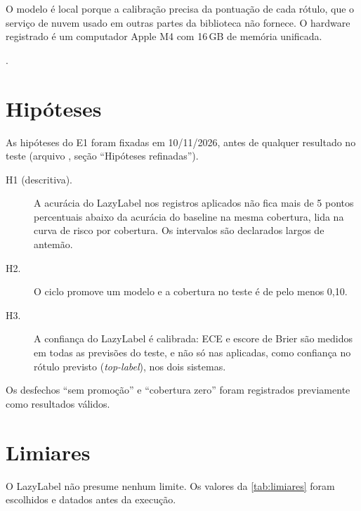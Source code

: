 O modelo é local porque a calibração precisa da pontuação de cada rótulo, que o serviço de nuvem usado em outras partes da biblioteca não fornece. O hardware registrado é um computador Apple M4 com 16\,GB de memória unificada.

.

\section{Hipóteses}

As hipóteses do E1 foram fixadas em 10/11/2026, antes de qualquer resultado no teste (arquivo , seção ``Hipóteses refinadas'').

\begin{description}
  \item[H1 (descritiva).] A acurácia do LazyLabel nos registros aplicados não fica mais de 5 pontos percentuais abaixo da acurácia do baseline na mesma cobertura, lida na curva de risco por cobertura. Os intervalos são declarados largos de antemão.
  \item[H2.] O ciclo promove um modelo e a cobertura no teste é de pelo menos 0{,}10.
  \item[H3.] A confiança do LazyLabel é calibrada: ECE e escore de Brier são medidos em todas as previsões do teste, e não só nas aplicadas, como confiança no rótulo previsto (\emph{top-label}), nos dois sistemas.
\end{description}

Os desfechos ``sem promoção'' e ``cobertura zero'' foram registrados previamente como resultados válidos.

\section{Limiares}

O LazyLabel não presume nenhum limite. Os valores da \autoref{tab:limiares} foram escolhidos e datados antes da execução.

